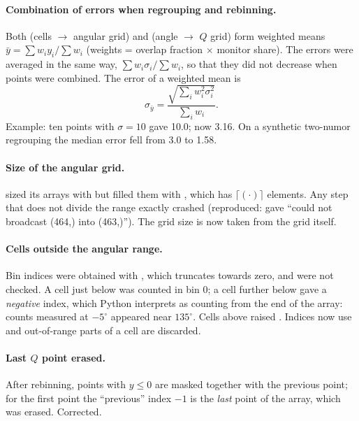 \documentclass[11pt,a4paper]{article}
\begin{document}
\paragraph{ Combination of errors when regrouping and rebinning.} \newbeh{}
Both  (cells $\to$ angular grid) and  (angle
$\to$ $Q$ grid) form weighted means $\bar y = \sum w_i y_i/\sum w_i$ (weights
= overlap fraction $\times$ monitor share). The errors were averaged in the
same way, $\sum w_i\sigma_i/\sum w_i$, so that they did not decrease when
points were combined. The error of a weighted mean is
\begin{equation}
  \sigma_{\bar y} = \frac{\sqrt{\sum_i w_i^2\sigma_i^2}}{\sum_i w_i}.
\end{equation}
Example: ten points with $\sigma=10$ gave 10.0; now 3.16. On a synthetic
two-numor regrouping the median error fell from 3.0 to 1.58.

\paragraph{ Size of the angular grid.}  sized its
arrays with  but filled them with
, which has $\lceil(\cdot)\rceil$
elements. Any step that does not divide the range exactly crashed
(reproduced:  gave ``could not broadcast (464,) into
(463,)''). The grid size is now taken from the grid itself.

\paragraph{ Cells outside the angular range.} Bin indices were
obtained with , which truncates towards zero, and were not
checked. A cell just below  was counted in bin 0; a cell further
below gave a \emph{negative} index, which Python interprets as counting
from the end of the array: counts measured at $-5^\circ$ appeared near
$135^\circ$. Cells above  raised . Indices now
use  and out-of-range parts of a cell are discarded.

\paragraph{ Last $Q$ point erased.} After rebinning, points with
$y\le0$ are masked together with the previous point; for the first point
the ``previous'' index $-1$ is the \emph{last} point of the array, which was
erased. Corrected.
\end{document}
